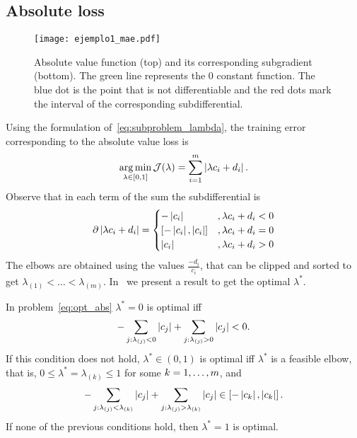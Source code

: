\subsection{Absolute loss}
\begin{figure}[t!]
    \centering
    \texttt{[image: ejemplo1\_mae.pdf]}
    \caption{Absolute value function (top) and its corresponding subgradient (bottom). The green line represents the $0$ constant function. The blue dot is the point that is not differentiable and the red dots mark the interval of the corresponding subdifferential.}
    \label{fig:abs_loss}
\end{figure}
Using the formulation of~\eqref{eq:subproblem_lambda}, the training error corresponding to the absolute value loss is
\begin{equation}
    \label{eq:opt_abs}
    \argmin_{\lambda \in [0, 1]} \mathcal{J}(\lambda) = \sum_{i=1}^{\npertask} \abs{\lambda c_i + d_i}.
\end{equation}
Observe that in each term of the sum the subdifferential is 
\begin{align*}
    \partial \abs{\lambda c_i + d_i} = 
    \begin{cases}
        -\abs{c_i} &, \lambda c_i + d_i  < 0 \\
        [-\abs{c_i}, \abs{c_i}] &, \lambda c_i + d_i  = 0 \\
        \abs{c_i} &, \lambda c_i + d_i  > 0 \\
    \end{cases} 
\end{align*}
The elbows are obtained using the values $\frac{-d_i}{c_i}$, that can be clipped and sorted to get ${\lambda}_{(1)} < \ldots < {\lambda}_{(m)}$.
In~\citet[Proposition 2]{RuizAD21} we present a result to get the optimal $\lambda^*$.
\begin{prop}\label{prop:abs_neurocom2020}
    In problem~\eqref{eq:opt_abs} $\lambda^*=0$ is optimal iff
    \begin{equation}\nonumber
        - \sum_{j: \lambda_{(j)} < 0} \left|c_{j}\right| + \sum_{j: \lambda_{(j)} > 0} \left|c_{j}\right| < 0.
        \end{equation}
    If this condition does not hold, $\lambda^* \in (0,1)$ is optimal iff $\lambda^*$ is a feasible elbow, that is, $0 \leq \lambda^* = \lambda_{(k)} \leq 1$ for some $k=1, \dotsc, m$, and
    \begin{equation}\label{sol_abs_e}
    - \sum_{j: \lambda_{(j)} < \lambda_{(k)}} \abs{c_{j}} + \sum_{j: \lambda_{(j)} > \lambda_{(k)}} \abs{c_{j}} \in \left[ -  \abs{c_{k}},  \abs{c_{k}}  \right] .
    \end{equation}
    If none of the previous conditions hold, then $\lambda^*=1$ is optimal.
\end{prop}
